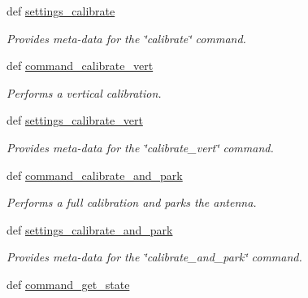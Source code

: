 \begin{DoxyCompactItemize}
def \hyperlink{classhwm_1_1hardware_1_1devices_1_1drivers_1_1mxl__antenna__controller_1_1mxl__antenna__controll042461b90848f732dc4817f26065c532_acb6846b1ddcd5fef4fe4e8d8be0a2042}{settings\-\_\-calibrate}
\begin{DoxyCompactList}\small\item\em Provides meta-\/data for the \char`\"{}calibrate\char`\"{} command. \end{DoxyCompactList}\item 
def \hyperlink{classhwm_1_1hardware_1_1devices_1_1drivers_1_1mxl__antenna__controller_1_1mxl__antenna__controll042461b90848f732dc4817f26065c532_a0fb5078d04c3f5fe3bf6c4d9fbb555f3}{command\-\_\-calibrate\-\_\-vert}
\begin{DoxyCompactList}\small\item\em Performs a vertical calibration. \end{DoxyCompactList}\item 
def \hyperlink{classhwm_1_1hardware_1_1devices_1_1drivers_1_1mxl__antenna__controller_1_1mxl__antenna__controll042461b90848f732dc4817f26065c532_a70dec425d4cb61505e6b7b3b7222a27d}{settings\-\_\-calibrate\-\_\-vert}
\begin{DoxyCompactList}\small\item\em Provides meta-\/data for the \char`\"{}calibrate\-\_\-vert\char`\"{} command. \end{DoxyCompactList}\item 
def \hyperlink{classhwm_1_1hardware_1_1devices_1_1drivers_1_1mxl__antenna__controller_1_1mxl__antenna__controll042461b90848f732dc4817f26065c532_a5a84165484ab6f9bdb43713b298054c5}{command\-\_\-calibrate\-\_\-and\-\_\-park}
\begin{DoxyCompactList}\small\item\em Performs a full calibration and parks the antenna. \end{DoxyCompactList}\item 
def \hyperlink{classhwm_1_1hardware_1_1devices_1_1drivers_1_1mxl__antenna__controller_1_1mxl__antenna__controll042461b90848f732dc4817f26065c532_af83dc8e14dbaab39a913d5f0562b7de4}{settings\-\_\-calibrate\-\_\-and\-\_\-park}
\begin{DoxyCompactList}\small\item\em Provides meta-\/data for the \char`\"{}calibrate\-\_\-and\-\_\-park\char`\"{} command. \end{DoxyCompactList}\item 
def \hyperlink{classhwm_1_1hardware_1_1devices_1_1drivers_1_1mxl__antenna__controller_1_1mxl__antenna__controll042461b90848f732dc4817f26065c532_ada6f4041e5dcfb5a378a1fd5c996f42c}{command\-\_\-get\-\_\-state}

\end{DoxyCompactItemize}
